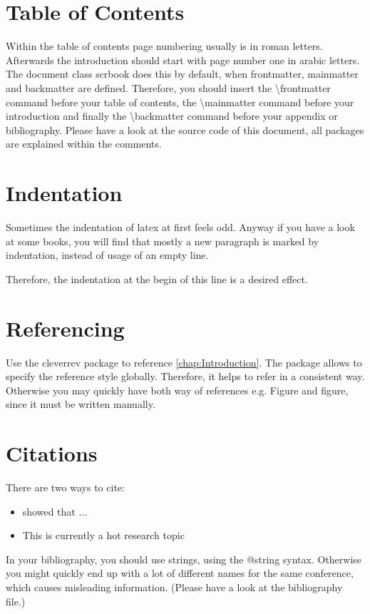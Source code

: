 \documentclass[12pt, %
               a4paper, %
               twoside, %
               openright, %
               abstract=on, %
               DIV=11,      %
               BCOR=8mm]{scrbook} %
\begin{document}
\section{Table of Contents}
Within the table of contents page numbering usually is in roman letters.
Afterwards the introduction should start with page number one in arabic letters.
The document class scrbook does this by default, when frontmatter, mainmatter and backmatter are defined.
Therefore, you should insert the \textbackslash frontmatter command before your table of contents, the \textbackslash mainmatter command before your introduction 
and finally the \textbackslash backmatter command before your appendix or bibliography.
Please have a look at the source code of this document, all packages are explained within the comments.


\section{Indentation}
Sometimes the indentation of latex at first feels odd.
Anyway if you have a look at some books, you will find that mostly a new paragraph is marked by indentation, instead of usage of an empty line.

Therefore, the indentation at the begin of this line is a desired effect.

\section{Referencing}
Use the cleverrev package to reference \cref{chap:Introduction}.
The package allows to specify the reference style globally.
Therefore, it helps to refer in a consistent way.
Otherwise you may quickly have both way of references e.g. Figure and figure, since it must be written manually.

\section{Citations}
There are two ways to cite:
\begin{itemize}
\item \citet{muster} showed that ...
\item This is currently a hot research topic \citep{muster}
\end{itemize}
In your bibliography, you should use strings, using the @string syntax.
Otherwise you might quickly end up with a lot of different names for the same conference, which causes misleading information.
(Please have a look at the bibliography file.)
\end{document}
